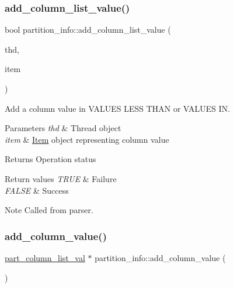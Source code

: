 \subsubsection{\texorpdfstring{add\+\_\+column\+\_\+list\+\_\+value()}{add\_column\_list\_value()}}
{\footnotesize\ttfamily bool partition\+\_\+info\+::add\+\_\+column\+\_\+list\+\_\+value (\begin{DoxyParamCaption}\item[{T\+HD $\ast$}]{thd,  }\item[{\mbox{\hyperlink{classItem}{Item}} $\ast$}]{item }\end{DoxyParamCaption})}

Add a column value in V\+A\+L\+U\+ES L\+E\+SS T\+H\+AN or V\+A\+L\+U\+ES IN.


\begin{DoxyParams}{Parameters}
{\em thd} & Thread object \\
\hline
{\em item} & \mbox{\hyperlink{classItem}{Item}} object representing column value\\
\hline
\end{DoxyParams}
\begin{DoxyReturn}{Returns}
Operation status 
\end{DoxyReturn}

\begin{DoxyRetVals}{Return values}
{\em T\+R\+UE} & Failure \\
\hline
{\em F\+A\+L\+SE} & Success\\
\hline
\end{DoxyRetVals}
\begin{DoxyNote}{Note}
Called from parser. 
\end{DoxyNote}
\mbox{\label{classpartition__info_a1639184674abb6b682cc323448cffc11}} 
\subsubsection{\texorpdfstring{add\+\_\+column\+\_\+value()}{add\_column\_value()}}
{\footnotesize\ttfamily \mbox{\hyperlink{structp__column__list__val}{part\+\_\+column\+\_\+list\+\_\+val}} $\ast$ partition\+\_\+info\+::add\+\_\+column\+\_\+value (\begin{DoxyParamCaption}{ }\end{DoxyParamCaption})}

